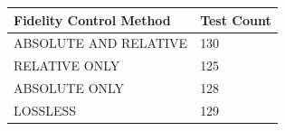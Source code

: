 \begin{table}[h!]
\centering
\begin{tabular}{ll}
\hline
\textbf{Fidelity Control Method} & \textbf{Test Count} \\ 
\hline
ABSOLUTE AND RELATIVE & 130 \\ 
RELATIVE ONLY & 125 \\ 
ABSOLUTE ONLY & 128 \\ 
LOSSLESS & 129 \\ 
\hline
\end{tabular}
\end{table}